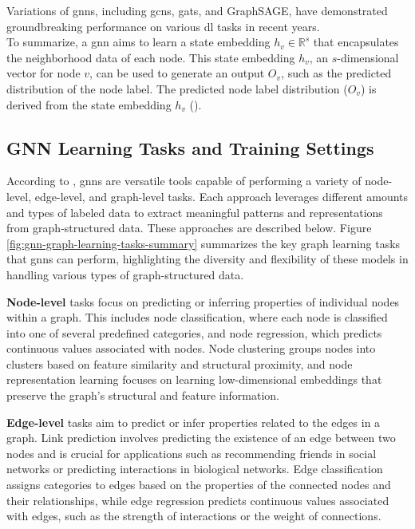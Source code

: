 Variations of \glspl{gnn}, including \glspl{gcn}, \glspl{gat}, and GraphSAGE, have demonstrated groundbreaking performance on various \gls{dl} tasks in recent years.
\\To summarize, a \gls{gnn} aims to learn a state embedding \( h_v \in \mathbb{R}^s \) that encapsulates the neighborhood data of each node.
This state embedding \( h_v \), an $s$-dimensional vector for node \( v \), can be used to generate an output \( O_v \), such as the predicted distribution of the node label.
The predicted node label distribution (\( O_v \)) is derived from the state embedding \( h_v \) (\cite{Rong2019}).

\subsection*{GNN Learning Tasks and Training Settings}
According to \cite{Zhou2020,Wu2021}, \glspl{gnn} are versatile tools capable of performing a variety of node-level, edge-level, and graph-level tasks.
Each approach leverages different amounts and types of labeled data to extract meaningful patterns and representations from graph-structured data.
These approaches are described below.
Figure \ref{fig:gnn-graph-learning-tasks-summary} summarizes the key graph learning tasks that \glspl{gnn} can perform, highlighting the diversity and flexibility of these models in handling various types of graph-structured data.

\textbf{Node-level} tasks focus on predicting or inferring properties of individual nodes within a graph. This includes node classification, where each node is classified into one of several predefined categories, and node regression, which predicts continuous values associated with nodes.
Node clustering groups nodes into clusters based on feature similarity and structural proximity, and node representation learning focuses on learning low-dimensional embeddings that preserve the graph's structural and feature information.

\textbf{Edge-level} tasks aim to predict or infer properties related to the edges in a graph.
Link prediction involves predicting the existence of an edge between two nodes and is crucial for applications such as recommending friends in social networks or predicting interactions in biological networks.
Edge classification assigns categories to edges based on the properties of the connected nodes and their relationships, while edge regression predicts continuous values associated with edges, such as the strength of interactions or the weight of connections.

